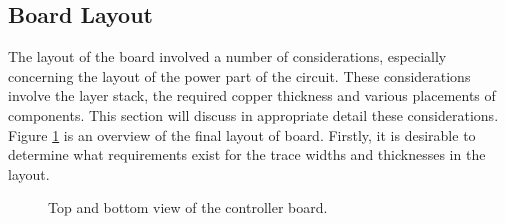 \subsection{Board Layout} %
\label{sub:board_layout}
The layout of the board involved a number of considerations, especially concerning the layout of the power part of the circuit.
These considerations involve the layer stack, the required copper thickness and various placements of components.
This section will discuss in appropriate detail these considerations.
Figure \ref{fig:board_layout} is an overview of the final layout of board.
Firstly, it is desirable to determine what requirements exist for the trace widths and thicknesses in the layout.

\begin{figure}
	\centering
	\caption{Top and bottom view of the controller board.}
	\label{fig:board_layout}
\end{figure}

